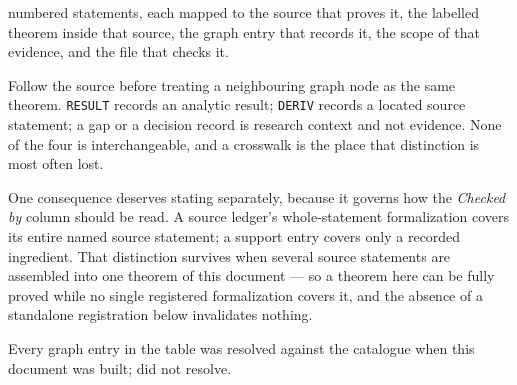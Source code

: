 \CrosswalkRows{} numbered statements, each mapped to the source that
proves it, the labelled theorem inside that source, the graph entry
that records it, the scope of that evidence, and the file that checks
it.

Follow the source before treating a neighbouring graph node as the same
theorem. \texttt{RESULT} records an analytic result; \texttt{DERIV}
records a located source statement; a gap or a decision record is
research context and not evidence. None of the four is interchangeable,
and a crosswalk is the place that distinction is most often lost.

One consequence deserves stating separately, because it governs how the
\textit{Checked by} column should be read. A source ledger's
whole-statement formalization covers its entire named source statement;
a support entry covers only a recorded ingredient. That distinction
survives when several source statements are assembled into one theorem
of this document --- so a theorem here can be fully proved while no
single registered formalization covers it, and the absence of a
standalone registration below invalidates nothing.

Every graph entry in the table was resolved against the catalogue when
this document was built; \CrosswalkUnresolved{} did not resolve.


